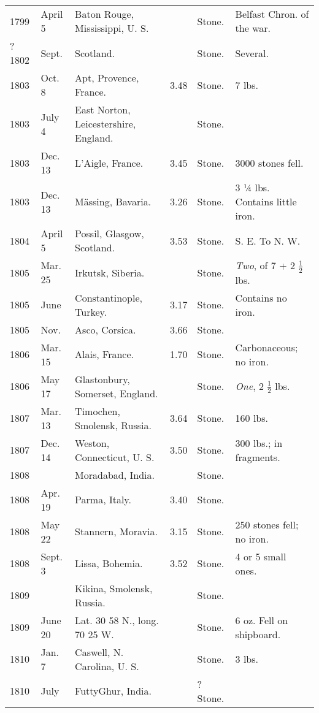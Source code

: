 \documentclass[a4paper, 12pt, oneside]{article}
\begin{document}
\begin{center}
\begin{longtable}{|p{10mm}|p{15mm}|p{32mm}|p{13mm}|p{13mm}|p{26mm}|}
        1799 & April 5 & Baton Rouge, Mississippi, U. S. & ~ & Stone. & Belfast Chron. of the war. \\
        ? 1802 & Sept. & Scotland. & ~ & Stone. & Several. \\
        1803 & Oct. 8 & Apt, Provence, France. & 3.48 & Stone. & 7 lbs. \\
        1803 & July 4 & East Norton, Leicestershire, England. & ~ & Stone. & ~ \\
        1803 & Dec. 13 & L’Aigle, France. & 3.45 & Stone. & 3000 stones fell. \\
        1803 & Dec. 13 & Mässing, Bavaria. & 3.26 & Stone. & 3 ¼ lbs. Contains little iron. \\
        1804 & April 5 & Possil, Glasgow, Scotland. & 3.53 & Stone. & S. E. To N. W. \\
        1805 & Mar. 25 & Irkutsk, Siberia. & ~ & Stone. & \emph{Two}, of 7 + 2 $\frac{1}{2}$ lbs. \\
        1805 & June & Constantinople, Turkey. & 3.17 & Stone. & Contains no iron. \\
        1805 & Nov. & Asco, Corsica. & 3.66 & Stone. & ~ \\
        1806 & Mar. 15 & Alais, France. & 1.70 & Stone. & Carbonaceous; no iron. \\
        1806 & May 17 & Glastonbury, Somerset, England. & ~ & Stone. & \emph{One}, 2 $\frac{1}{2}$ lbs. \\
        1807 & Mar. 13 & Timochen, Smolensk, Russia. & 3.64 & Stone. & 160 lbs. \\
        1807 & Dec. 14 & Weston, Connecticut, U. S. & 3.50 & Stone. & 300 lbs.; in fragments. \\
        1808 & ~ & Moradabad, India. & ~ & Stone. & ~ \\
        1808 & Apr. 19 & Parma, Italy. & 3.40 & Stone. & ~ \\
        1808 & May 22 & Stannern, Moravia. & 3.15 & Stone. & 250 stones fell; no iron. \\
        1808 & Sept. 3 & Lissa, Bohemia. & 3.52 & Stone. & 4 or 5 small ones. \\
        1809 & ~ & Kikina, Smolensk, Russia. & ~ & Stone. & ~ \\
        1809 & June 20 & Lat. 30 58 N., long. 70 25 W. & ~ & Stone. & 6 oz. Fell on ship\-board. \\
        1810 & Jan. 7 & Caswell, N. Carolina, U. S. & ~ & Stone. & 3 lbs. \\
        1810 & July & Futty\-Ghur, India. & ~ & ? Stone. & ~ \\

\end{longtable}
\end{center}
\end{document}
